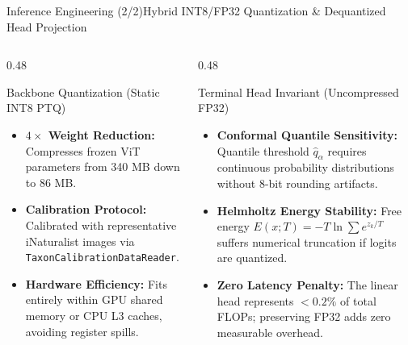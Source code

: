 \begin{frame}{Inference Engineering (2/2)}{Hybrid INT8/FP32 Quantization \& Dequantized Head Projection}
    \vspace{-0.15cm}
    \begin{columns}[T]
        \begin{column}{0.48\textwidth}
            \begin{block}{Backbone Quantization (Static INT8 PTQ)}
                \begin{itemize}\scriptsize
                    \item \textbf{$4\times$ Weight Reduction:} Compresses frozen ViT parameters from 340 MB down to 86 MB.
                    \item \textbf{Calibration Protocol:} Calibrated with representative iNaturalist images via \texttt{TaxonCalibrationDataReader}.
                    \item \textbf{Hardware Efficiency:} Fits entirely within GPU shared memory or CPU L3 caches, avoiding register spills.
                \end{itemize}
            \end{block}
        \end{column}
        \begin{column}{0.48\textwidth}
            \begin{block}{Terminal Head Invariant (Uncompressed FP32)}
                \begin{itemize}\scriptsize
                    \item \textbf{Conformal Quantile Sensitivity:} Quantile threshold $\hat{q}_\alpha$ requires continuous probability distributions without 8-bit rounding artifacts.
                    \item \textbf{Helmholtz Energy Stability:} Free energy $E(x; T) = -T \ln \sum e^{z_k/T}$ suffers numerical truncation if logits are quantized.
                    \item \textbf{Zero Latency Penalty:} The linear head represents $<0.2\%$ of total FLOPs; preserving FP32 adds zero measurable overhead.
                \end{itemize}
            \end{block}
        \end{column}
    \end{columns}

\end{frame}

